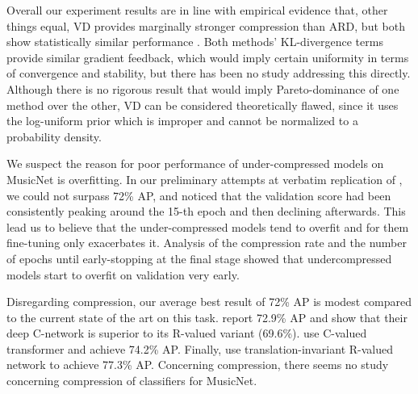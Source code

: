 \documentclass[10pt,a4paper,draft]{article}
\begin{document}
Overall our experiment results are in line with empirical evidence that, other things
equal, VD provides marginally stronger compression than ARD, but both show statistically
similar performance \cite[tab.1]{kharitonov_variational_2018}. Both methods' KL-divergence
terms provide similar gradient feedback, which would imply certain uniformity in terms
of convergence and stability, but there has been no study addressing this directly.
Although there is no rigorous result that would imply Pareto-dominance of one method
over the other, VD can be considered theoretically flawed, since it uses the log-uniform
prior which is improper and cannot be normalized to a probability density.

We suspect the reason for poor performance of under-compressed models on MusicNet is
overfitting. In our preliminary attempts at verbatim replication of \cite{trabelsi_deep_2018},
we could not surpass 72\% AP, and noticed that the validation score had been consistently
peaking around the 15-th epoch and then declining afterwards. This lead us to believe
that the under-compressed models tend to overfit and for them fine-tuning only exacerbates
it. Analysis of the compression rate and the number of epochs until early-stopping at
the final stage showed that undercompressed models start to overfit on validation very early.

Disregarding compression, our average best result of 72\% AP is modest compared to the current
state of the art on this task. \cite{trabelsi_deep_2018} report 72.9\% AP and show that their
deep C-network is superior to its R-valued variant (69.6\%). \cite{yang_complex_2019} use
C-valued transformer and achieve 74.2\% AP. Finally, \cite{thickstun_invariances_2018} use
translation-invariant R-valued network to achieve 77.3\% AP. Concerning compression, there
seems no study concerning compression of classifiers for MusicNet.


\end{document}
